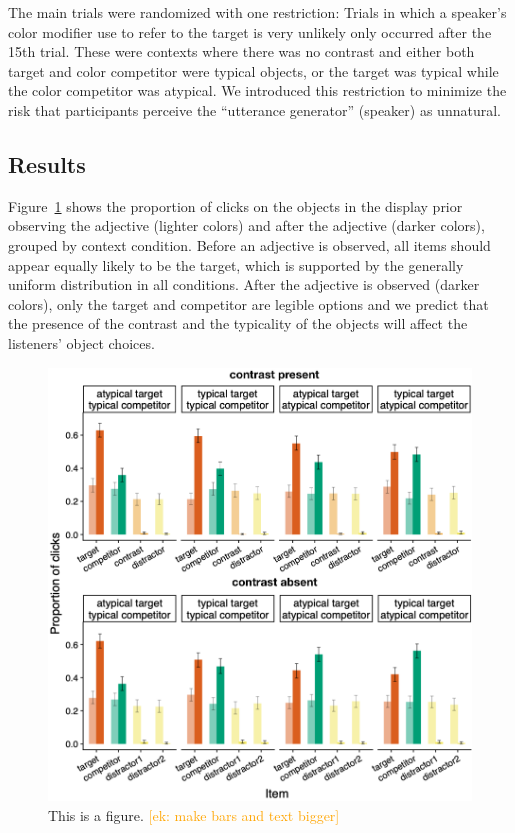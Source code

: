 \documentclass[10pt,letterpaper]{article}
\newcommand{\ek}[1]{\textcolor{Orange}{[ek: #1]}}
\begin{document}
The main trials were randomized with one restriction: Trials in which a speaker's color modifier use to refer to the target is very unlikely only occurred after the 15th trial. These were contexts where there was no contrast and either both target and color competitor were typical objects, or the target was typical while the color competitor was atypical. We introduced this restriction to minimize the risk that participants perceive the ``utterance generator'' (speaker) as unnatural.


\subsection{Results}
Figure~\ref{compr-results} shows the proportion of clicks on the objects in the display prior observing the adjective (lighter colors) and after the adjective (darker colors), grouped by context condition. Before an adjective is observed, all items should appear equally likely to be the target, which is supported by the generally uniform distribution in all conditions. After the adjective is observed (darker colors), only the target and competitor are legible options and we predict that the presence of the contrast and the typicality of the objects will affect the listeners' object choices.

\begin{figure}
	\begin{center}
		\includegraphics[width=.475\textwidth]{graphs/compr-bycond-paper.pdf}
	\end{center}
\caption{This is a figure. \ek{make bars and text bigger}} 
\label{compr-results}
\end{figure}
\end{document}
